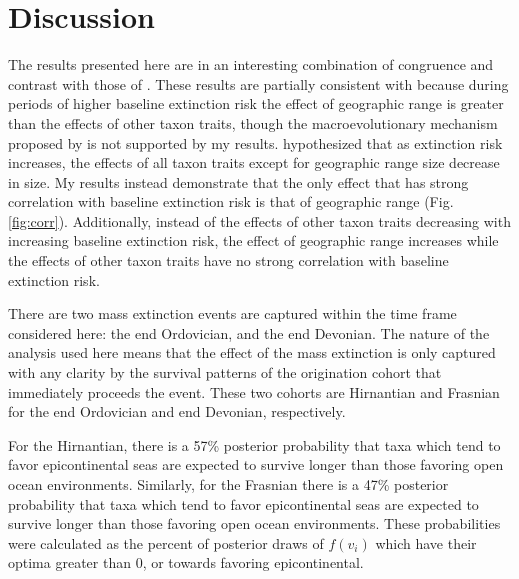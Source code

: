 \documentclass[12pt,letterpaper]{article}
\begin{document}
\section{Discussion}

The results presented here are in an interesting combination of congruence and contrast with those of \citet{Jablonski1986}.  These results are partially consistent with \citet{Jablonski1986} because during periods of higher baseline extinction risk the effect of geographic range is greater than the effects of other taxon traits, though the macroevolutionary mechanism proposed by \citet{Jablonski1986} is not supported by my results. \citet{Jablonski1986} hypothesized that as extinction risk increases, the effects of all taxon traits except for geographic range size decrease in size. My results instead demonstrate that the only effect that has strong correlation with baseline extinction risk is that of geographic range (Fig. \ref{fig:corr}). Additionally, instead of the effects of other taxon traits decreasing with increasing baseline extinction risk, the effect of geographic range increases while the effects of other taxon traits have no strong correlation with baseline extinction risk. 

There are two mass extinction events are captured within the time frame considered here: the end Ordovician, and the end Devonian. The nature of the analysis used here means that the effect of the mass extinction is only captured with any clarity by the survival patterns of the origination cohort that immediately proceeds the event. These two cohorts are Hirnantian and Frasnian for the end Ordovician and end Devonian, respectively.

For the Hirnantian, there is a 57\% posterior probability that taxa which tend to favor epicontinental seas are expected to survive longer than those favoring open ocean environments. Similarly, for the Frasnian there is a 47\% posterior probability that taxa which tend to favor epicontinental seas are expected to survive longer than those favoring open ocean environments. These probabilities were calculated as the percent of posterior draws of \(f(v_{i})\) which have their optima greater than 0, or towards favoring epicontinental. 
\end{document}
